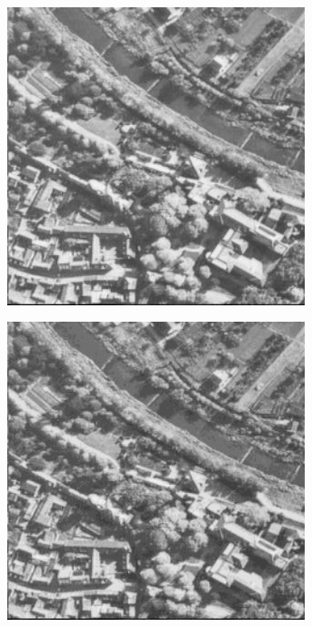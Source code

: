 \begin{figure}
\begin{subfigure}[b]{.23\textwidth}
  \caption{}
  \label{fig:test-images-aerial-truncate1}
\end{subfigure}
\begin{subfigure}[b]{.23\textwidth}
  \centering
  \includegraphics[width=0.95\textwidth]{figures/test-images/truncate2/aerial}
  \caption{}
  \label{fig:test-images-aerial-truncate2}
\end{subfigure}
\begin{subfigure}[b]{.23\textwidth}
  \centering
  \includegraphics[width=0.95\textwidth]{figures/test-images/truncate4/aerial}
  \caption{}
  \label{fig:test-images-aerial-truncate4}
\end{subfigure}


\end{figure}
